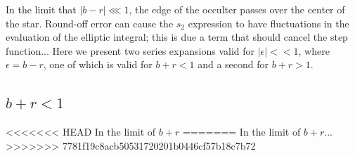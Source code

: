 \documentclass[modern]{aastex61}
\begin{document}
In the limit that $\vert b -r\vert \lll 1$, the edge of the occulter passes
over the center of the star.  Round-off error can cause the $s_2$ expression
to have fluctuations in the evaluation of the elliptic integral; this is
due a term that should cancel the step function...
Here we present two series expansions valid
for $\vert \epsilon \vert << 1$, where $\epsilon = b-r$, one of which is valid
for $b+r <1$ and a second for $b+r > 1$.

\subsection{$b+r <1$}

<<<<<<< HEAD
In the limit of $b+r$
=======
In the limit of $b+r$...
>>>>>>> 7781f19c8acb50531720201b0446cf57b18c7b72



\end{document}
